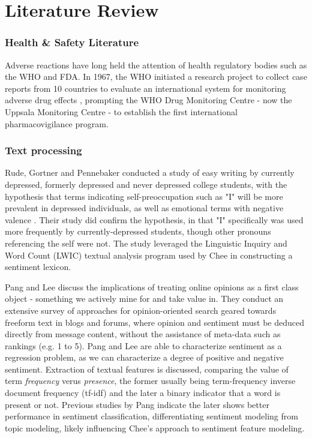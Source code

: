 \documentclass[twoside,11pt]{article}
\begin{document}
\section{Literature Review}

\subsubsection{Health & Safety Literature}
Adverse reactions have long held the attention of health regulatory bodies such as the WHO and FDA. In 1967, the WHO initiated a research project to collect case reports from 10 countries to evaluate an international system for monitoring adverse drug effects \citep{WHO}, prompting the WHO Drug Monitoring Centre - now the Uppsala Monitoring Centre - to establish the first international pharmacovigilance program.

\subsubsection{Text processing}
Rude, Gortner and Pennebaker conducted a study of easy writing by currently depressed, formerly depressed and never depressed college students, with the hypothesis that terms indicating self-preoccupation such as "I" will be more prevalent in depressed individuals, as well as emotional terms with negative valence \citep{Rude}. Their study did confirm the hypothesis, in that "I" specifically was used more frequently by currently-depressed students, though other pronouns referencing the self were not. The study leveraged the Linguistic Inquiry and Word Count (LWIC) textual analysis program used by Chee in constructing a sentiment lexicon.

Pang and Lee \citep{Pang} discuss the implications of treating online opinions as a first class object - something we actively mine for and take value in. They conduct an extensive survey of approaches for opinion-oriented search geared towards freeform text in blogs and forums, where opinion and sentiment must be deduced directly from message content, without the assistance of meta-data such as rankings (e.g.  1 to 5). Pang and Lee are able to characterize sentiment as a regression problem, as we can characterize a degree of positive and negative sentiment. Extraction of textual features is discussed, comparing the value of term \textit{frequency} verus \textit{presence}, the former usually being term-frequency inverse document frequency (tf-idf) and the later a binary indicator that a word is present or not. Previous studies by Pang indicate the later shows better performance in sentiment classification, differentiating sentiment modeling from topic modeling, likely influencing Chee's approach to sentiment feature modeling.
\end{document}
